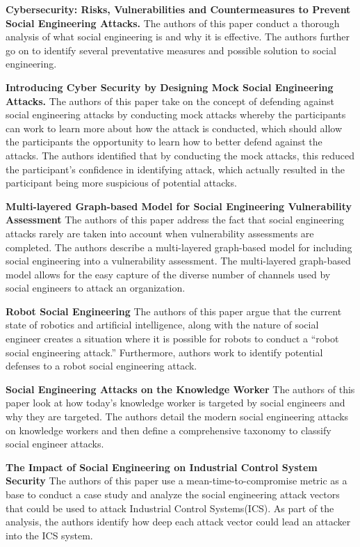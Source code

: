 \documentclass[conference]{IEEEtran}
\begin{document}
\textbf {Cybersecurity: Risks, Vulnerabilities and Countermeasures to Prevent Social Engineering Attacks.}
The authors of this paper conduct a thorough analysis of what social engineering is and why it is effective. The authors further go on to identify several preventative measures and possible solution to social engineering. 

\textbf {Introducing Cyber Security by Designing Mock Social Engineering Attacks. }
The authors of this paper take on the concept of defending against social engineering attacks by conducting mock attacks whereby the participants can work to learn more about how the attack is conducted, which should allow the participants the opportunity to learn how to better defend against the attacks. The authors identified that by conducting the mock attacks, this reduced the participant’s confidence in identifying attack, which actually resulted in the participant being more suspicious of potential attacks. 

\textbf {Multi-layered Graph-based Model for Social Engineering Vulnerability Assessment}
The authors of this paper address the fact that social engineering attacks rarely are taken into account when vulnerability assessments are completed. The authors describe a multi-layered graph-based model for including social engineering into a vulnerability assessment.  The multi-layered graph-based model allows for the easy capture of the diverse number of channels used by social engineers to attack an organization. 

\textbf {Robot Social Engineering}
The authors of this paper argue that the current state of robotics and artificial intelligence, along with the nature of social engineer creates a situation where it is possible for robots to conduct a “robot social engineering attack.”  Furthermore, authors work to identify potential defenses to a robot social engineering attack. 

\textbf {Social Engineering Attacks on the Knowledge Worker}
The authors of this paper look at how today’s knowledge worker is targeted by social engineers and why they are targeted. The authors detail the modern social engineering attacks on knowledge workers and then define a comprehensive taxonomy to classify social engineer attacks. 

\textbf {The Impact of Social Engineering on Industrial Control System Security}
The authors of this paper use a mean-time-to-compromise metric as a base to conduct a case study and analyze the social engineering attack vectors that could be used to attack Industrial Control Systems(ICS).  As part of the analysis, the authors identify how deep each attack vector could lead an attacker into the ICS system. 
\end{document}

